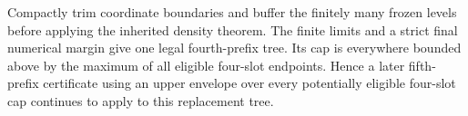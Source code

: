 Compactly trim
coordinate boundaries and buffer the finitely many frozen levels
before applying the inherited density theorem.  The finite limits
and a strict final numerical margin give one legal fourth-prefix
tree.  Its cap is everywhere bounded above by the maximum of all
eligible four-slot endpoints.  Hence a later fifth-prefix certificate
using an upper envelope over every potentially eligible four-slot
cap continues to apply to this replacement tree.
